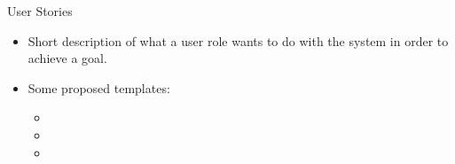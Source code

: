 \begin{Slide}{User Stories}
\begin{itemize}
\item Short description of what a user role wants to do with the system in order to achieve a goal. 
\item Some proposed templates:
\begin{itemize}
\item \fontsize{9}{11}\selectfont{}
\item \fontsize{9}{11}\selectfont{}
\item \fontsize{9}{11}\selectfont{}


\end{itemize}
\end{itemize}
\end{Slide}